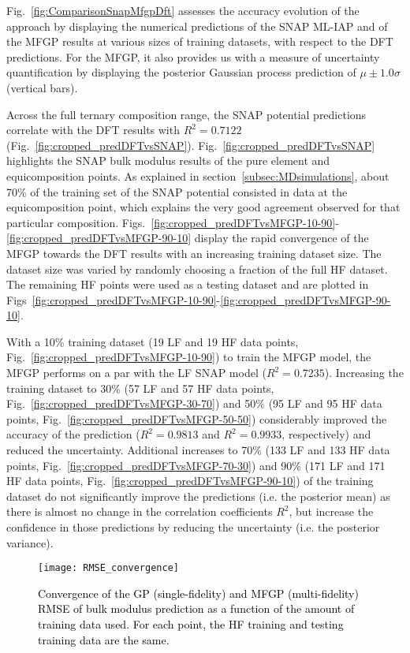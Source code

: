 \documentclass[%
 reprint,
aip,jcp
]{revtex4-1}
\newcommand{\review}[1]{\textcolor{black}{#1}}
\begin{document}
Fig.~\ref{fig:ComparisonSnapMfgpDft} assesses the accuracy evolution of 
the approach by displaying the numerical predictions of the SNAP ML-IAP 
and of the MFGP results at various sizes of training 
datasets, with respect to the DFT predictions. For the
MFGP, it also
provides us with a measure of uncertainty quantification by
displaying the posterior Gaussian process prediction of 
$\mu \pm 1.0\sigma$ (vertical bars). 

Across the full ternary composition range, the SNAP potential predictions 
correlate with the DFT results with  $R^2 = 0.7122$ 
(Fig.~\ref{fig:cropped_predDFTvsSNAP}). 
Fig.~\ref{fig:cropped_predDFTvsSNAP} highlights the SNAP bulk modulus 
results of the pure element and equicomposition points. 
As explained in section~\ref{subsec:MDsimulations},  about 70\% of the 
training set of the SNAP potential consisted in data at the
equicomposition point, which explains the very good agreement observed 
for that particular composition. 
Figs.~\ref{fig:cropped_predDFTvsMFGP-10-90}-\ref{fig:cropped_predDFTvsMFGP-90-10} display the rapid
convergence of the MFGP towards the DFT results with an increasing
training dataset size.
The dataset  size was varied by randomly choosing a fraction of the full HF dataset. 
The remaining HF points were used as a testing dataset and are plotted in Figs~\ref{fig:cropped_predDFTvsMFGP-10-90}-\ref{fig:cropped_predDFTvsMFGP-90-10}.

With a 10\% training dataset (19 LF and 19 HF data points, Fig.~\ref{fig:cropped_predDFTvsMFGP-10-90}) to train the MFGP 
model, the MFGP performs on a par with the LF SNAP model ($R^2 =
0.7235$). 
Increasing the training dataset to 30\% (57 LF and 57 HF data points,
Fig.~\ref{fig:cropped_predDFTvsMFGP-30-70}) and 50\% (95 LF and 95 HF 
data points, Fig.~\ref{fig:cropped_predDFTvsMFGP-50-50})
considerably improved the accuracy of the prediction ($R^2 =
0.9813$ and $R^2 = 0.9933$, respectively) and reduced the
uncertainty. 
Additional increases to 70\% (133 LF and 133 HF data points, 
Fig.~\ref{fig:cropped_predDFTvsMFGP-70-30}) and 90\% (171 LF and 171 HF 
data points, Fig.~\ref{fig:cropped_predDFTvsMFGP-90-10}) of the
training dataset do not significantly improve the predictions
(i.e. the posterior mean) as there is almost no change in the 
correlation coefficients $R^2$, but increase the confidence in
those predictions by reducing the uncertainty (i.e. the posterior 
variance). 

\begin{figure}[!htbp]
    \centering
    \texttt{[image: RMSE\_convergence]}
    \caption{\review{Convergence of the GP (single-fidelity) and MFGP (multi-fidelity) RMSE of bulk modulus prediction as a function of the amount of training data used. For each point, the HF training and testing training data are the same. }}
    \label{fig:cropped_rmseConvergence}
\end{figure}
\end{document}
